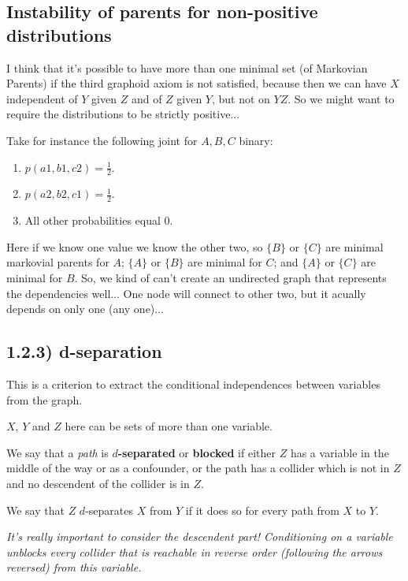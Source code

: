 \subsection{Instability of parents for non-positive distributions}

I think that it's possible to have more than one minimal set (of Markovian Parents) if the third graphoid axiom is not satisfied, because then we can have $X$ independent of $Y$ given $Z$ and of $Z$ given $Y$, but not on $YZ$. So we might want to require the distributions to be strictly positive...

Take for instance the following joint for $A,B,C$ binary:

\begin{enumerate}
    \item $p(a1,b1,c2) = \frac{1}{2}$.
    \item $p(a2,b2,c1) = \frac{1}{2}$.
    \item All other probabilities equal $0$.
\end{enumerate}

Here if we know one value we know the other two, so $\{B\}$ or $\{C\}$ are minimal markovial parents for $A$; $\{A\}$ or $\{B\}$ are minimal for $C$; and $\{A\}$ or $\{C\}$ are minimal for $B$. So, we kind of can't create an undirected graph that represents the dependencies well... One node will connect to other two, but it acually depends on only one (any one)...


\subsection{1.2.3) d-separation}

This is a criterion to extract the conditional independences between variables from the graph.

$X$, $Y$ and $Z$ here can be sets of more than one variable.

We say that a \textit{path} is \textbf{$d$-separated} or \textbf{blocked} if either $Z$ has a variable in the middle of the way or as a confounder, or the path has a collider which is not in $Z$ and no descendent of the collider is in $Z$. 

We say that $Z$ $d$-separates $X$ from  $Y$ if it does so for every path from $X$ to $Y$.

\textit{It's really important to consider the descendent part! Conditioning on a variable unblocks every collider that is reachable in reverse order (following the arrows reversed) from this variable.}


